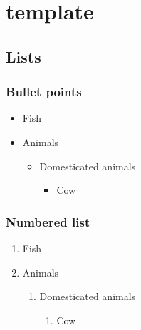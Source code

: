 \chapter{template}

\section{Lists}

\subsection{Bullet points}
\begin{itemize}
  \item Fish
  \item Animals
  \begin{itemize}
    \item Domesticated animals
    \begin{itemize}
      \item Cow
    \end{itemize}
  \end{itemize}
\end{itemize}
  
\subsection{Numbered list}

\begin{enumerate}
  \item Fish
  \item Animals
  \begin{enumerate}
    \item Domesticated animals
    \begin{enumerate}
      \item Cow
    \end{enumerate}
  \end{enumerate}
\end{enumerate}

